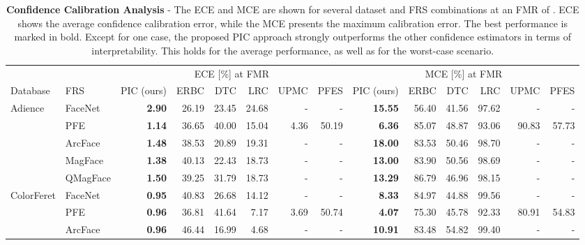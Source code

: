 \documentclass[10pt,twocolumn,letterpaper]{article}
\begin{document}
\begin{table*}[ht]
\small
\renewcommand{\arraystretch}{1.0}
\setlength{\tabcolsep}{2.8pt}
\centering
\caption{\textbf{Confidence Calibration Analysis} - The ECE and MCE are shown for several dataset and FRS combinations at an FMR of .
ECE shows the average confidence calibration error, while the MCE presents the maximum calibration error. The best performance is marked in bold.
Except for one case, the proposed PIC approach strongly outperforms the other confidence estimators in terms of interpretability. This holds for the average performance, as well as for the worst-case scenario.}
\label{tab:CalibrationAnalysis}
\begin{tabular}{llrrrrrrrrrrrr}
\Xhline{2\arrayrulewidth}
           &          & \multicolumn{6}{c}{ECE [\%] at  FMR}  & \multicolumn{6}{c}{MCE [\%] at  FMR}    \\
           \cmidrule(rl){3-8} \cmidrule(rl){9-14} 
Database   & FRS      & PIC (ours) & ERBC  & DTC   & LRC   & UPMC & PFES  & PIC (ours) & ERBC  & DTC   & LRC   & UPMC   & PFES \\
\hline
Adience    & FaceNet  & \textbf{2.90}       & 26.19 & 23.45 & 24.68 & -    & -     & \textbf{15.55}      & 56.40 & 41.56 & 97.62 & -      & -     \\
           & PFE      & \textbf{1.14}       & 36.65 & 40.00 & 15.04 & 4.36 & 50.19 & \textbf{6.36}       & 85.07 & 48.87 & 93.06 & 90.83  & 57.73   \\
           & ArcFace  & \textbf{1.48}       & 38.53 & 20.89 & 19.31 & -    & -     & \textbf{18.00}      & 83.53 & 50.46 & 98.70 & -      & -     \\
           & MagFace  & \textbf{1.38}       & 40.13 & 22.43 & 18.73 & -    & -     & \textbf{13.00}      & 83.90 & 50.56 & 98.69 & -      & -     \\
           & QMagFace & \textbf{1.50}       & 39.25 & 31.79 & 18.73 & -    & -     & \textbf{13.29}      & 86.79 & 46.96 & 98.15 & -      & -     \\
\hline
ColorFeret & FaceNet  & \textbf{0.95}       & 40.83 & 26.68 & 14.12 & -    & -     & \textbf{8.33}       & 84.97 & 44.88 & 99.56 & -      & -     \\
           & PFE      & \textbf{0.96}       & 36.81 & 41.64 & 7.17  & 3.69 & 50.74 & \textbf{4.07}       & 75.30 & 45.78 & 92.33 & 80.91  & 54.83 \\
           & ArcFace  & \textbf{0.96}       & 46.44 & 16.99 & 4.68  & -    & -     & \textbf{10.91}      & 83.48 & 54.82 & 99.40 & -      & -     \\

\end{tabular}
\end{table*}
\end{document}
